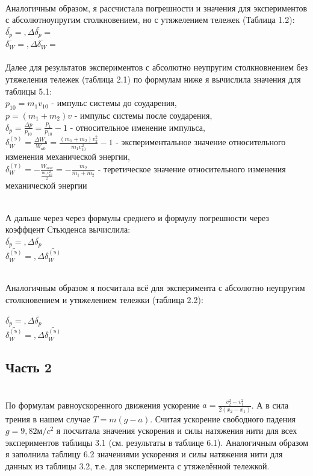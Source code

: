 \documentclass[20pt]{article}
\begin{document}
\\ Аналогичным образом, я рассчистала погрешности и значения для экспериментов с абсолютноупругим столкновением, но с утяжелением тележек (Таблица 1.2):\\
$\bar{\delta_p} = , \Delta \bar{\delta_p} = $\\
$\bar{\delta_W} = , \Delta \bar{\delta_W} = $\\

\\ Далее для результатов экспериментов с абсолютно неупругим столкновнением без утяжеления тележек (таблица 2.1) по формулам ниже я вычислила значения для таблицы 5.1: \\
$p_{10} = m_1 v_{10}$ - импульс системы до соударения,\\
$p =(m_1 + m_2) v$ - импульс системы после соударения,\\
$\delta_p = \frac{\Delta p}{p_{10}} =  \frac{p_1}{p_{10}} - 1$ - относительное именение импульса,\\
$\delta^{(э)}_W = \frac{\Delta W_к}{W_{к0}} = \frac{(m_1 + m_2) v_2^2}{m_1 v_{10}^2} - 1$ - экспериментальное значение относительного изменения механической энергии, \\
$\delta^{(т)}_W = -\frac{W_{пот}}{\frac{m_1 v^2_{10}}{2}} = -\frac{m_2}{m_1 + m_2}$ - теретическое значение относительного изменения механической энергии

\\ А дальше через через формулы среднего и формулу погрешности через коэффцент Стьюденса вычислила:\\
$\bar{\delta_p} = , \Delta \bar{\delta_p} $\\
$\bar{\delta^{(э)}_W} = , \Delta \bar{\delta^{(э)}_W}$

\\Аналогичным образом я посчитала всё для эксперимента с абсолютно неупругим столкновением и утяжелением тележки (таблица 2.2):

$\bar{\delta_p} = , \Delta \bar{\delta_p} $\\
$\bar{\delta^{(э)}_W} = , \Delta \bar{\delta^{(э)}_W}$

\subsection*{Часть 2}

\\ По формулам равноускоренного движения ускорение $a = \frac{v^2_2 -v^2_1}{2(x_2 - x_1)}$. А в сила трения в нашем случае $T = m(g - a)$. Считая ускорение свободного падения $g = 9,82 м/c^2$ я посчитала значения ускорения и силы натяжения нити для всех экспериментов таблицы 3.1 (см. результаты в таблице 6.1). Аналогичным образом я заполнила таблицу 6.2 значениями ускорения и силы натяжения нити для данных из таблицы 3.2, т.е. для эксперимента с утяжелённой тележкой.
\end{document}
